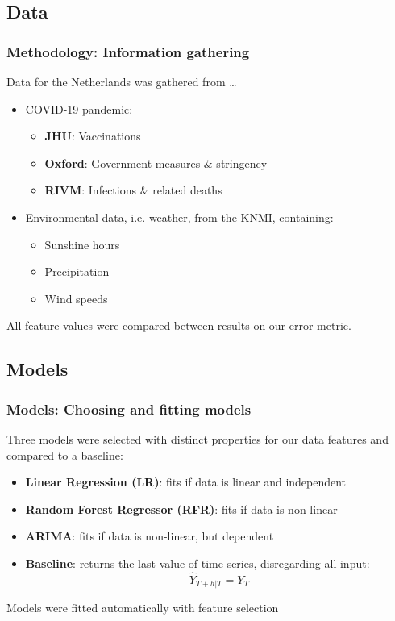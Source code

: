 \documentclass[aspectratio=169,classic]{uva-inf-presentation}
\begin{document}
\subsection{Data}
\begin{frame}
\frametitle{Methodology: Information gathering}
Data for the Netherlands was gathered from \ldots
\begin{itemize}
    \item COVID-19 pandemic: 
    \begin{itemize}
        \item \textbf{JHU}: Vaccinations
        \item \textbf{Oxford}: Government measures \& stringency
        \item \textbf{RIVM}: Infections \& related deaths
    \end{itemize}
    \item Environmental data, i.e. weather, from the KNMI, containing:
    \begin{itemize}
        \item Sunshine hours
        \item Precipitation
        \item Wind speeds
    \end{itemize}
\end{itemize}
All feature values were compared between results on our error metric.
\end{frame}

\twocolumn


\onecolumn



\subsection{Models}
\begin{frame}
\frametitle{Models: Choosing and fitting models}
Three models were selected with distinct properties for our data features and compared to a baseline:
\begin{itemize}
    \item \textbf{Linear Regression (LR)}: fits if data is linear and independent
    \item \textbf{Random Forest Regressor (RFR)}: fits if data is non-linear
    \item \textbf{ARIMA}: fits if data is non-linear, but dependent
    \item \textbf{Baseline}: returns the last value of time-series, disregarding all input: $$\hat{Y}_{T+h|T} = Y_T$$
\end{itemize}
Models were fitted automatically with feature selection
\end{frame}
\end{document}
